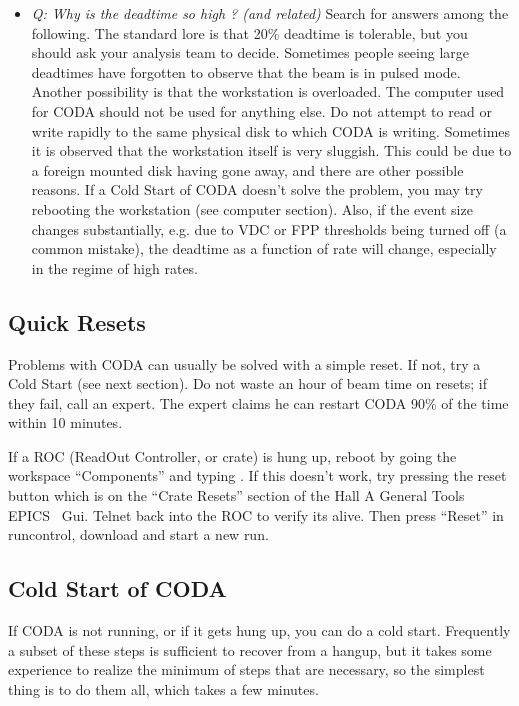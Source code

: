 {\begin{itemize}
\item{ {\it Q: Why is the deadtime so high ?  
(and related)} \hskip 0.1in
Search for answers among the following.
The standard lore is that 20\% deadtime is tolerable,
but you should ask your analysis team to decide.
Sometimes people seeing large deadtimes
have forgotten to observe that the beam is in
pulsed mode.  Another possibility is that the
workstation is overloaded.  The computer used
for CODA should not be used for anything else.
Do not attempt to read or write rapidly to the
same physical disk to which CODA is writing.
Sometimes it is observed that the workstation
itself is very sluggish.  
This could be due to a foreign
mounted disk having gone away, and there are
other possible reasons.  If a Cold Start of CODA
doesn't solve the problem, you may 
try rebooting the workstation
(see computer section).  Also, if
the event size changes substantially, e.g. due
to VDC or FPP thresholds being turned off (a common mistake), 
the deadtime as a function
of rate will change, especially 
in the regime of high rates.}

\end{itemize}

\subsection{ Quick Resets }

Problems with CODA can usually be solved with a simple
reset.  If not, try a Cold Start (see next section).
Do not waste an hour of beam time on resets; 
if they fail, call an expert.  
The expert claims he can restart CODA 
90\% of the time within 10 minutes.

If a ROC (ReadOut Controller, or crate)
is hung up, reboot by going the workspace
``Components'' and typing .  If this 
doesn't work, try pressing the reset button 
which is on the ``Crate Resets'' section of the
Hall A General Tools EPICS~\cite{EPICSwww} Gui.  Telnet back into
the ROC to verify its alive.  Then press ``Reset''
in runcontrol, download and start a new run.

\subsection{ Cold Start of CODA}

\par
If CODA is not running, or if it gets hung up,
you can do a cold start.  Frequently a subset of
these steps is sufficient to recover from a hangup,
but it takes some experience to realize the
minimum of steps that
are necessary, so the simplest 
thing is to do them all, which takes a few minutes.

}
